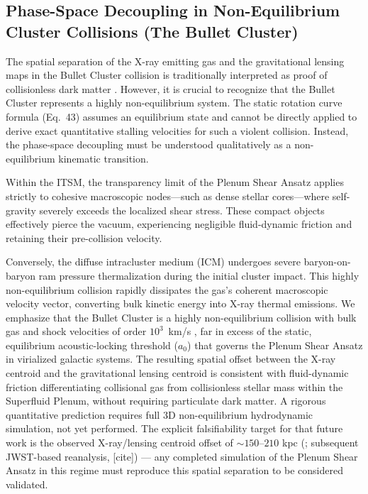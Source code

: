 \documentclass[aps,prd,10pt,twocolumn,superscriptaddress,nofootinbib,floatfix]{revtex4-2}
\begin{document}
\subsection{Phase-Space Decoupling in Non-Equilibrium Cluster Collisions (The Bullet Cluster)}
The spatial separation of the X-ray emitting gas and the gravitational lensing maps in the Bullet Cluster collision is traditionally interpreted as proof of collisionless dark matter \cite{bullet}. However, it is crucial to recognize that the Bullet Cluster represents a highly non-equilibrium system. The static rotation curve formula (Eq.~43) assumes an equilibrium state and cannot be directly applied to derive exact quantitative stalling velocities for such a violent collision. Instead, the phase-space decoupling must be understood qualitatively as a non-equilibrium kinematic transition.

Within the ITSM, the transparency limit of the Plenum Shear Ansatz applies strictly to cohesive macroscopic nodes---such as dense stellar cores---where self-gravity severely exceeds the localized shear stress. These compact objects effectively pierce the vacuum, experiencing negligible fluid-dynamic friction and retaining their pre-collision velocity.

Conversely, the diffuse intracluster medium (ICM) undergoes severe baryon-on-baryon ram pressure thermalization during the initial cluster impact. This highly non-equilibrium collision rapidly dissipates the gas's coherent macroscopic velocity vector, converting bulk kinetic energy into X-ray thermal emissions. We emphasize that the Bullet Cluster is a highly non-equilibrium collision with bulk gas and shock velocities of order $10^3$~km/s \cite{bullet}, far in excess of the static, equilibrium acoustic-locking threshold ($a_0$) that governs the Plenum Shear Ansatz in virialized galactic systems. The resulting spatial offset between the X-ray centroid and the gravitational lensing centroid is consistent with fluid-dynamic friction differentiating collisional gas from collisionless stellar mass within the Superfluid Plenum, without requiring particulate dark matter. A rigorous quantitative prediction requires full 3D non-equilibrium hydrodynamic simulation, not yet performed. The explicit falsifiability target for that future work is the observed X-ray/lensing centroid offset of $\sim 150$--$210$ kpc (\cite{bullet}; subsequent JWST-based reanalysis, [cite]) --- any completed simulation of the Plenum Shear Ansatz in this regime must reproduce this spatial separation to be considered validated.
\end{document}
